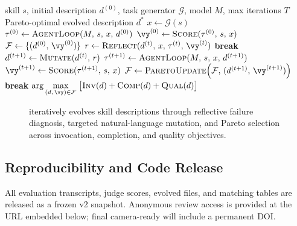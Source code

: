 \begin{algorithm}[t]
\caption{\gepamed: Reflective Skill Description Evolution}
\label{alg:gepa_med}
\begin{algorithmic}[1]
\Require skill $s$, initial description $d^{(0)}$, task generator $\mathcal{G}$, model $M$, max iterations $T$
\Ensure Pareto-optimal evolved description $d^{*}$
\State $x \gets \mathcal{G}(s)$ 
\State $\tau^{(0)} \gets \textsc{AgentLoop}(M,\,s,\,x,\,d^{(0)})$ 
\State $\vy^{(0)} \gets \textsc{Score}(\tau^{(0)},\,s,\,x)$ 
\State $\mathcal{F} \gets \{(d^{(0)},\,\vy^{(0)})\}$ 
    \State $r \gets \textsc{Reflect}(d^{(t)},\,x,\,\tau^{(t)},\,\vy^{(t)})$ 
     \textbf{break} \EndIf {}
    \State $d^{(t+1)} \gets \textsc{Mutate}(d^{(t)},\,r)$ 
    \State $\tau^{(t+1)} \gets \textsc{AgentLoop}(M,\,s,\,x,\,d^{(t+1)})$
    \State $\vy^{(t+1)} \gets \textsc{Score}(\tau^{(t+1)},\,s,\,x)$
    \State $\mathcal{F} \gets \textsc{ParetoUpdate}\!\left(\mathcal{F},\,(d^{(t+1)},\,\vy^{(t+1)})\right)$
     \textbf{break} \EndIf {}
\EndFor
\State \Return $\displaystyle\arg\max_{(d,\,\vy)\in\mathcal{F}}\;\bigl[\textsc{Inv}(d)+\textsc{Comp}(d)+\textsc{Qual}(d)\bigr]$
\end{algorithmic}
\end{algorithm}

\begin{figure}[!t]
\caption{\gepamed iteratively evolves skill descriptions through reflective failure diagnosis, targeted natural-language mutation, and Pareto selection across invocation, completion, and quality objectives.}
\label{fig:gepa_med}
\end{figure}

\subsection{Reproducibility and Code Release}
\label{subsec:reproducibility}

All evaluation transcripts, judge scores, evolved \skillmd files, and matching tables are released as a frozen v2 snapshot.
Anonymous review access is provided at the URL embedded below; final camera-ready will include a permanent DOI.

